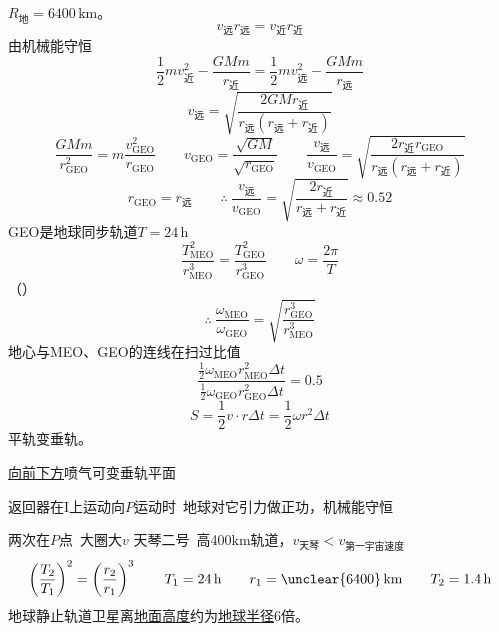 $R_{\text{地}}=6400\,\mathrm{km}$。
\[
v_{\text{远}}r_{\text{远}}=v_{\text{近}}r_{\text{近}}
\]
由机械能守恒
\[
\frac12mv_{\text{近}}^2-\frac{GMm}{r_{\text{近}}}=\frac12mv_{\text{远}}^2-\frac{GMm}{r_{\text{远}}}
\]
\[
v_{\text{远}}=\sqrt{\frac{2GMr_{\text{近}}}{r_{\text{远}}(r_{\text{远}}+r_{\text{近}})}}
\]
\[
\frac{GMm}{r_{\mathrm{GEO}}^2}=m\frac{v_{\mathrm{GEO}}^2}{r_{\mathrm{GEO}}}\qquad v_{\mathrm{GEO}}=\frac{\sqrt{GM}}{\sqrt{r_{\mathrm{GEO}}}}\qquad \frac{v_{\text{远}}}{v_{\mathrm{GEO}}}=\sqrt{\frac{2r_{\text{近}}r_{\mathrm{GEO}}}{r_{\text{远}}(r_{\text{远}}+r_{\text{近}})}}
\]
\[
r_{\mathrm{GEO}}=r_{\text{远}}\qquad \therefore\ \frac{v_{\text{远}}}{v_{\mathrm{GEO}}}=\sqrt{\frac{2r_{\text{近}}}{r_{\text{远}}+r_{\text{近}}}}\approx0.52
\]
GEO是地球同步轨道\quad $T=24\,\mathrm{h}$
\[
\frac{T_{\mathrm{MEO}}^2}{r_{\mathrm{MEO}}^3}=\frac{T_{\mathrm{GEO}}^2}{r_{\mathrm{GEO}}^3}\qquad \omega=\frac{2\pi}{T}
\]
（） %
\[
\therefore\ \frac{\omega_{\mathrm{MEO}}}{\omega_{\mathrm{GEO}}}=\sqrt{\frac{r_{\mathrm{GEO}}^3}{r_{\mathrm{MEO}}^3}}
\]
地心与MEO、GEO的连线在扫过比值 %
\[
\frac{\frac12\omega_{\mathrm{MEO}}r_{\mathrm{MEO}}^2\Delta t}{\frac12\omega_{\mathrm{GEO}}r_{\mathrm{GEO}}^2\Delta t}=0.5
\]
\[
S=\frac12v\cdot r\Delta t=\frac12\omega r^2\Delta t
\]
平轨变垂轨。

\underline{向前下方}喷气可变垂轨\quad {}平面 %

返回器在I上运动向$P$运动时\ 地球对它引力做正功，机械能守恒

两次在$P$点\ 大圈大$v$
天琴二号\ 高400$\mathrm{km}$轨道，\underline{$v_{\text{天琴}}<v_{\text{第一宇宙速度}}$}
\[
\left(\frac{T_2}{T_1}\right)^2=\left(\frac{r_2}{r_1}\right)^3\qquad T_1=24\,\mathrm{h}\qquad r_1=\unclear{6400}\,\mathrm{km}\qquad T_2=1.4\,\mathrm{h}
\]
地球静止轨道卫星离\underline{地面高度}约为\underline{地球半径}6倍。

